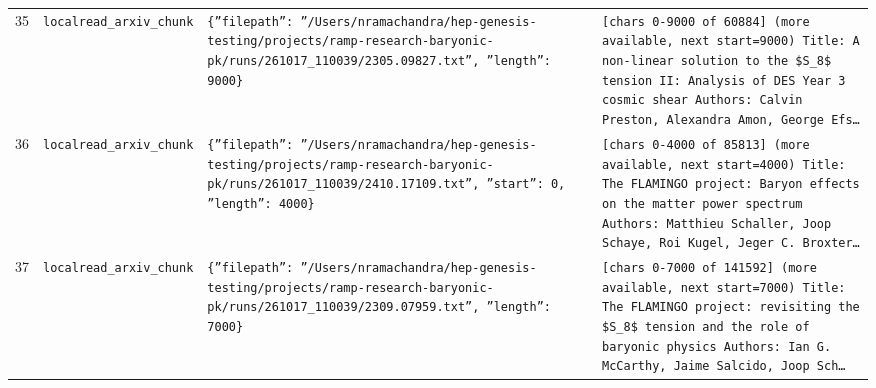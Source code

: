 \documentclass[11pt,a4paper]{article}
\begin{document}
\begin{longtable}{@{}p{}p{}p{}p{}@{}}
35 & \texttt{local}\newline\texttt{read\_\allowbreak{}arxiv\_\allowbreak{}chunk} & \texttt{\{''filepath'':\allowbreak{} ''/\allowbreak{}Users/\allowbreak{}nramachandra/\allowbreak{}hep-genesis-testing/\allowbreak{}projects/\allowbreak{}ramp-research-baryonic-pk/\allowbreak{}runs/\allowbreak{}261017\_\allowbreak{}110039/\allowbreak{}2305.09827.txt'',\allowbreak{} ''length'':\allowbreak{} 9000\}\allowbreak{}} & \texttt{[chars 0-9000 of 60884]\allowbreak{} (more available,\allowbreak{} next start=\allowbreak{}9000)\allowbreak{}  Title:\allowbreak{} A non-linear solution to the \$S\_\allowbreak{}8\$ tension II:\allowbreak{} Analysis of DES Year 3 cosmic shear Authors:\allowbreak{} Calvin Preston,\allowbreak{} Alexandra Amon,\allowbreak{} George Efs\ldots{}\allowbreak{}} \\
36 & \texttt{local}\newline\texttt{read\_\allowbreak{}arxiv\_\allowbreak{}chunk} & \texttt{\{''filepath'':\allowbreak{} ''/\allowbreak{}Users/\allowbreak{}nramachandra/\allowbreak{}hep-genesis-testing/\allowbreak{}projects/\allowbreak{}ramp-research-baryonic-pk/\allowbreak{}runs/\allowbreak{}261017\_\allowbreak{}110039/\allowbreak{}2410.17109.txt'',\allowbreak{} ''start'':\allowbreak{} 0,\allowbreak{} ''length'':\allowbreak{} 4000\}\allowbreak{}} & \texttt{[chars 0-4000 of 85813]\allowbreak{} (more available,\allowbreak{} next start=\allowbreak{}4000)\allowbreak{}  Title:\allowbreak{} The FLAMINGO project:\allowbreak{} Baryon effects on the matter power spectrum Authors:\allowbreak{} Matthieu Schaller,\allowbreak{} Joop Schaye,\allowbreak{} Roi Kugel,\allowbreak{} Jeger C. Broxter\ldots{}\allowbreak{}} \\
37 & \texttt{local}\newline\texttt{read\_\allowbreak{}arxiv\_\allowbreak{}chunk} & \texttt{\{''filepath'':\allowbreak{} ''/\allowbreak{}Users/\allowbreak{}nramachandra/\allowbreak{}hep-genesis-testing/\allowbreak{}projects/\allowbreak{}ramp-research-baryonic-pk/\allowbreak{}runs/\allowbreak{}261017\_\allowbreak{}110039/\allowbreak{}2309.07959.txt'',\allowbreak{} ''length'':\allowbreak{} 7000\}\allowbreak{}} & \texttt{[chars 0-7000 of 141592]\allowbreak{} (more available,\allowbreak{} next start=\allowbreak{}7000)\allowbreak{}  Title:\allowbreak{} The FLAMINGO project:\allowbreak{} revisiting the \$S\_\allowbreak{}8\$ tension and the role of baryonic physics Authors:\allowbreak{} Ian G. McCarthy,\allowbreak{} Jaime Salcido,\allowbreak{} Joop Sch\ldots{}\allowbreak{}} \\

\end{longtable}
\end{document}

